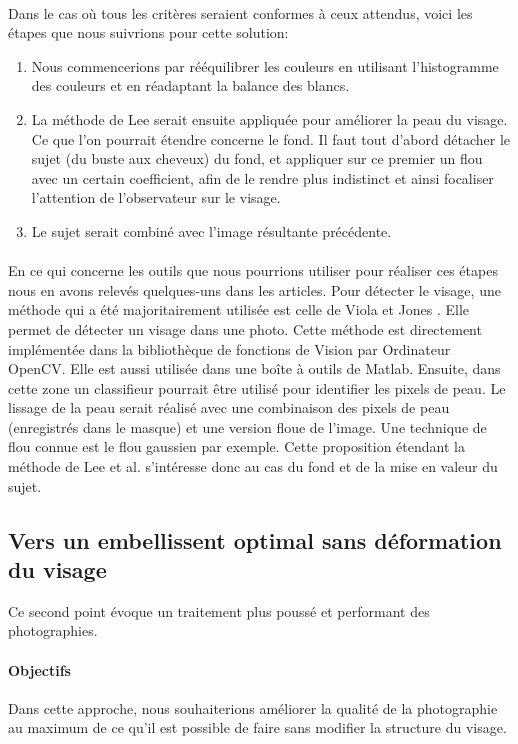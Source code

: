 \documentclass[11pt, french]{report-rd-info}
\begin{document}
\paragraph{}
Dans le cas où tous les critères seraient conformes à ceux attendus, voici les étapes que nous suivrions pour cette solution:
\begin{enumerate}
\item Nous commencerions par rééquilibrer les couleurs en utilisant l’histogramme des couleurs et en réadaptant la balance des blancs.
\item La méthode de Lee  \cite{Lee} serait ensuite appliquée pour améliorer la peau du visage. Ce que l’on pourrait étendre concerne le fond. Il faut tout d’abord détacher le sujet (du buste aux cheveux) du fond, et appliquer sur ce premier un flou avec un certain coefficient, afin de le rendre plus indistinct et ainsi focaliser l’attention de l’observateur sur le visage.
\item Le sujet serait combiné avec l’image résultante précédente.
\end{enumerate}
\paragraph{}
En ce qui concerne les outils que nous pourrions utiliser pour réaliser ces étapes nous en avons relevés quelques-uns dans les articles. Pour détecter le visage, une méthode qui a été majoritairement utilisée est celle de Viola et Jones \cite{Viola2004}. Elle permet de détecter un visage dans une photo. Cette méthode est directement implémentée dans la bibliothèque de fonctions de Vision par Ordinateur OpenCV. Elle est aussi utilisée dans une boîte à outils de Matlab. Ensuite, dans cette zone un classifieur pourrait être utilisé pour identifier les pixels de peau.
Le lissage de la peau serait réalisé avec une combinaison des pixels de peau (enregistrés dans le masque) et une version floue de l’image. Une technique de flou connue est le flou gaussien par exemple.
Cette proposition étendant la méthode de Lee et al. \cite{Lee} s’intéresse donc au cas du fond et de la mise en valeur du sujet.
\subsection{Vers un embellissent optimal sans déformation du visage}
\label{propdeux}
Ce second point évoque un traitement plus poussé et performant des photographies.
\paragraph{Objectifs}
Dans cette approche, nous souhaiterions améliorer la qualité de la photographie au maximum de ce qu’il est possible de faire sans modifier la structure du visage.
\end{document}
